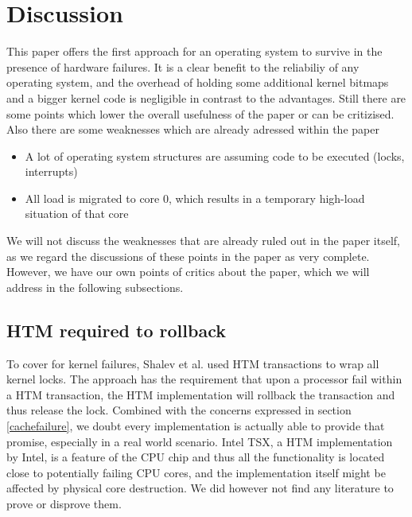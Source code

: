 \documentclass[a4paper,10pt,twoside]{article}
\begin{document}
\section{Discussion}

This paper offers the first approach for an operating system to survive in the presence of hardware failures. It is a clear benefit to the reliabiliy of any operating system, and the overhead of holding some additional kernel bitmaps and a bigger kernel code is negligible in contrast to the advantages.
Still there are some points which lower the overall usefulness of the paper or can be critizised. Also there are some weaknesses which are already adressed within the paper
\begin{itemize}
	\item A lot of operating system structures are assuming code to be executed (locks, interrupts)
	\item All load is migrated to core 0, which results in a temporary high-load situation of that core
\end{itemize}

We will not discuss the weaknesses that are already ruled out in the paper itself, as we regard the discussions of these points in the paper as very complete. However, we have our own points of critics about the paper, which we will address in the following subsections.

\subsection{HTM required to rollback}
To cover for kernel failures, Shalev et al. used HTM transactions to wrap all kernel locks. The approach has the requirement that upon a processor fail within a HTM transaction, the HTM implementation will rollback the transaction and thus release the lock. Combined with the concerns expressed in section \ref{cachefailure}, we doubt every implementation is actually able to provide that promise, especially in a real world scenario. Intel TSX, a HTM implementation by Intel, is a feature of the CPU chip and thus all the functionality is located close to potentially failing CPU cores, and the implementation itself might be affected by physical core destruction. We did however not find any literature to prove or disprove them.

\end{document}
